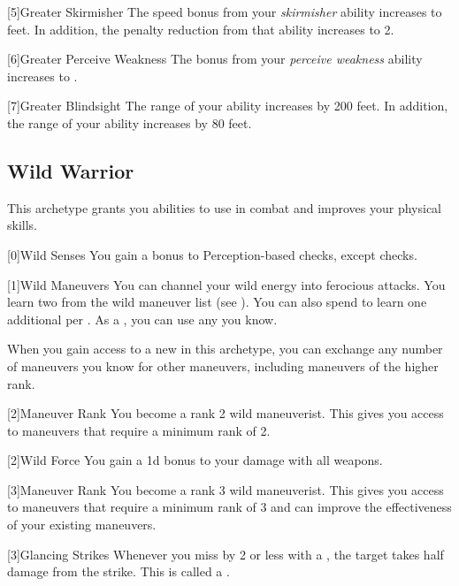         [5]{Greater Skirmisher} The speed bonus from your \textit{skirmisher} ability increases to  feet.
        In addition, the penalty reduction from that ability increases to 2.

        [6]{Greater Perceive Weakness} The bonus from your \textit{perceive weakness} ability increases to .

        [7]{Greater Blindsight} The range of your  ability increases by 200 feet.
        In addition, the range of your  ability increases by 80 feet.

    \newpage
    \subsection{Wild Warrior}
        This archetype grants you abilities to use in combat and improves your physical skills.

        [0]{Wild Senses} You gain a  bonus to Perception-based checks, except  checks.

        {
            [1]{Wild Maneuvers}
            You can channel your wild energy into ferocious attacks.
            You learn two  from the wild maneuver list (see ).
            You can also spend  to learn one additional  per .
            As a , you can use any  you know.

            When you gain access to a new  in this archetype,
                you can exchange any number of maneuvers you know for other maneuvers,
                including maneuvers of the higher rank.
        }

        {
            [2]{Maneuver Rank} You become a rank 2 wild maneuverist.
            This gives you access to maneuvers that require a minimum rank of 2.

            [2]{Wild Force} You gain a \plus1d bonus to your damage with all weapons.
        }

        {
            [3]{Maneuver Rank} You become a rank 3 wild maneuverist.
            This gives you access to maneuvers that require a minimum rank of 3 and can improve the effectiveness of your existing maneuvers.

            [3]{Glancing Strikes} Whenever you miss by 2 or less with a , the target takes half damage from the strike.
            This is called a .
        }

